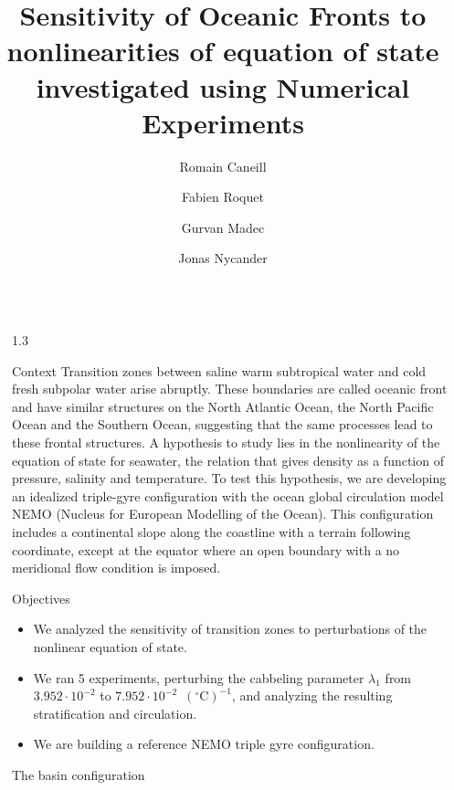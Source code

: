 \documentclass[final]{beamer}
\title{Sensitivity of Oceanic Fronts to nonlinearities of equation of
state investigated using Numerical Experiments}
\author{Romain Caneill \inst{1} \and Fabien Roquet \inst{1}
  \and Gurvan Madec \inst{2} \and Jonas Nycander \inst{3}}
\institute[shortinst]{\inst{1} University of Gothenburg, Sweden
  \samelineand \inst{2} LOCEAN-IPSL Sorbonne university, France
  \samelineand \inst{3} Stockholm University, Sweden}
\newlength{\sepwidth}
\newlength{\colwidth}
\newcommand{\separatorcolumn}{\begin{column}{\sepwidth}\end{column}}
\begin{document}
\begin{frame}[t]
\begin{columns}[t]
\separatorcolumn

\begin{column}{1.3\colwidth}
  \begin{block}{Context}
    Transition zones between saline warm subtropical water and
    cold fresh subpolar water arise
    abruptly. These boundaries are called oceanic front
    and have similar structures on the North
    Atlantic Ocean, the North Pacific Ocean and
    the Southern Ocean, suggesting that the same
    processes lead to these frontal structures.
    A hypothesis to study lies in the nonlinearity of
    the equation of state for seawater, the
    relation that gives density as a function of
    pressure, salinity and temperature.
    To test this hypothesis, we are developing
    an idealized triple-gyre configuration with the
    ocean global circulation model NEMO (Nucleus for
    European Modelling of the Ocean). This
    configuration includes a continental slope
    along the coastline with a terrain following
    coordinate, except at the equator where an open
    boundary with a no meridional flow
    condition is imposed.
  \end{block}

  \begin{alertblock}{Objectives}
    \begin{itemize}
    \item We analyzed the sensitivity of transition zones to perturbations of the
      nonlinear equation of state.
    \item We ran 5 experiments, perturbing the cabbeling
      parameter $\lambda_1$ from $3.952 \cdot 10^{-2}$ to $7.952 \cdot 10^{-2}$
      \,$(^\circ\text{C})^{-1}$, and analyzing the resulting
      stratification and circulation.
    \item We are building a reference NEMO triple gyre configuration.
    \end{itemize}
  \end{alertblock}

  \begin{block}{The basin configuration}
\end{block}
\end{column}
\end{columns}
\end{frame}
\end{document}
